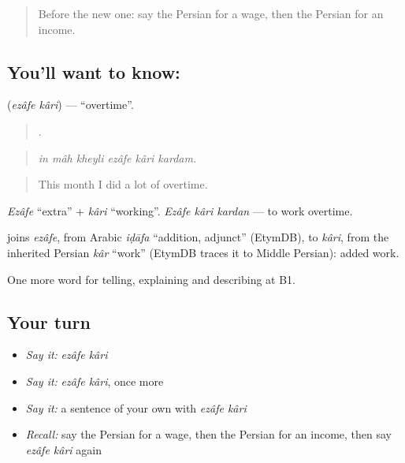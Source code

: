 \label{lesson:FA-C378-ezafe-kari}



\begin{quote}
Before the new one: say the Persian for a wage, then the Persian for an income.
\end{quote}

\subsection*{You'll want to know:  }
\textbf{ } (\emph{ezâfe kâri}) — \textquotedblleft{}overtime\textquotedblright{}.

\begin{quote}
     .
\end{quote}

\begin{quote}
\emph{in mâh kheyli ezâfe kâri kardam.}
\end{quote}

\begin{quote}
This month I did a lot of overtime.
\end{quote}

\emph{Ezâfe} \textquotedblleft{}extra\textquotedblright{} + \emph{kâri} \textquotedblleft{}working\textquotedblright{}. \emph{Ezâfe kâri kardan} — to work overtime.

\begin{cousinweb}
\textbf{ } joins \emph{ezâfe}, from Arabic \emph{iḍāfa} \textquotedblleft{}addition, adjunct\textquotedblright{} (EtymDB), to \emph{kâri}, from the inherited Persian \emph{kâr} \textquotedblleft{}work\textquotedblright{} (EtymDB traces it to Middle Persian): added work.
\end{cousinweb}

\begin{grammarlens}[title={What you've built}]
One more word for telling, explaining and describing at B1.
\end{grammarlens}

\subsection*{Your turn}
\begin{itemize}
\raggedright
  \item \emph{Say it:} \emph{ezâfe kâri}
  \item \emph{Say it:} \emph{ezâfe kâri}, once more
  \item \emph{Say it:} a sentence of your own with \emph{ezâfe kâri}
  \item \emph{Recall:} say the Persian for a wage, then the Persian for an income, then say \emph{ezâfe kâri} again
\end{itemize}

